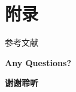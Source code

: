 \section{附录}

\begin{frame}{参考文献}
  \printbibliography
\end{frame}

\begin{frame}{}
  \centering
    \begin{LARGE}
      \textbf{\textcolor{SJTUPrimary}{Any Questions?}}
    \end{LARGE}
\end{frame}

\begin{frame}{}
  \centering
    \begin{LARGE}
      \textbf{\textcolor{SJTUPrimary}{谢谢聆听}}
    \end{LARGE}
\end{frame}
